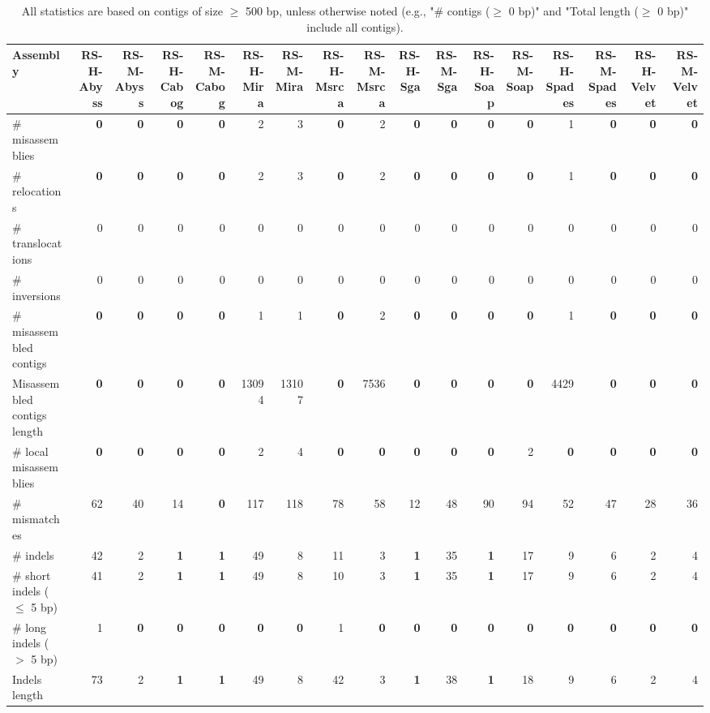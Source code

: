 \documentclass[12pt,a4paper]{article}
\begin{document}
\begin{table}[ht]
\begin{center}
\caption{All statistics are based on contigs of size $\geq$ 500 bp, unless otherwise noted (e.g., "\# contigs ($\geq$ 0 bp)" and "Total length ($\geq$ 0 bp)" include all contigs).}
\begin{tabular}{|l*{16}{|r}|}
\hline
Assembly & RS-H-Abyss & RS-M-Abyss & RS-H-Cabog & RS-M-Cabog & RS-H-Mira & RS-M-Mira & RS-H-Msrca & RS-M-Msrca & RS-H-Sga & RS-M-Sga & RS-H-Soap & RS-M-Soap & RS-H-Spades & RS-M-Spades & RS-H-Velvet & RS-M-Velvet \\ \hline
\# misassemblies & {\bf 0} & {\bf 0} & {\bf 0} & {\bf 0} & 2 & 3 & {\bf 0} & 2 & {\bf 0} & {\bf 0} & {\bf 0} & {\bf 0} & 1 & {\bf 0} & {\bf 0} & {\bf 0} \\ \hline
\hspace{5mm}\# relocations & {\bf 0} & {\bf 0} & {\bf 0} & {\bf 0} & 2 & 3 & {\bf 0} & 2 & {\bf 0} & {\bf 0} & {\bf 0} & {\bf 0} & 1 & {\bf 0} & {\bf 0} & {\bf 0} \\ \hline
\hspace{5mm}\# translocations & 0 & 0 & 0 & 0 & 0 & 0 & 0 & 0 & 0 & 0 & 0 & 0 & 0 & 0 & 0 & 0 \\ \hline
\hspace{5mm}\# inversions & 0 & 0 & 0 & 0 & 0 & 0 & 0 & 0 & 0 & 0 & 0 & 0 & 0 & 0 & 0 & 0 \\ \hline
\# misassembled contigs & {\bf 0} & {\bf 0} & {\bf 0} & {\bf 0} & 1 & 1 & {\bf 0} & 2 & {\bf 0} & {\bf 0} & {\bf 0} & {\bf 0} & 1 & {\bf 0} & {\bf 0} & {\bf 0} \\ \hline
Misassembled contigs length & {\bf 0} & {\bf 0} & {\bf 0} & {\bf 0} & 13094 & 13107 & {\bf 0} & 7536 & {\bf 0} & {\bf 0} & {\bf 0} & {\bf 0} & 4429 & {\bf 0} & {\bf 0} & {\bf 0} \\ \hline
\# local misassemblies & {\bf 0} & {\bf 0} & {\bf 0} & {\bf 0} & 2 & 4 & {\bf 0} & {\bf 0} & {\bf 0} & {\bf 0} & {\bf 0} & 2 & {\bf 0} & {\bf 0} & {\bf 0} & {\bf 0} \\ \hline
\# mismatches & 62 & 40 & 14 & {\bf 0} & 117 & 118 & 78 & 58 & 12 & 48 & 90 & 94 & 52 & 47 & 28 & 36 \\ \hline
\# indels & 42 & 2 & {\bf 1} & {\bf 1} & 49 & 8 & 11 & 3 & {\bf 1} & 35 & {\bf 1} & 17 & 9 & 6 & 2 & 4 \\ \hline
\hspace{5mm}\# short indels ($\leq$ 5 bp) & 41 & 2 & {\bf 1} & {\bf 1} & 49 & 8 & 10 & 3 & {\bf 1} & 35 & {\bf 1} & 17 & 9 & 6 & 2 & 4 \\ \hline
\hspace{5mm}\# long indels ($>$ 5 bp) & 1 & {\bf 0} & {\bf 0} & {\bf 0} & {\bf 0} & {\bf 0} & 1 & {\bf 0} & {\bf 0} & {\bf 0} & {\bf 0} & {\bf 0} & {\bf 0} & {\bf 0} & {\bf 0} & {\bf 0} \\ \hline
Indels length & 73 & 2 & {\bf 1} & {\bf 1} & 49 & 8 & 42 & 3 & {\bf 1} & 38 & {\bf 1} & 18 & 9 & 6 & 2 & 4 \\ \hline
\end{tabular}
\end{center}
\end{table}
\end{document}
